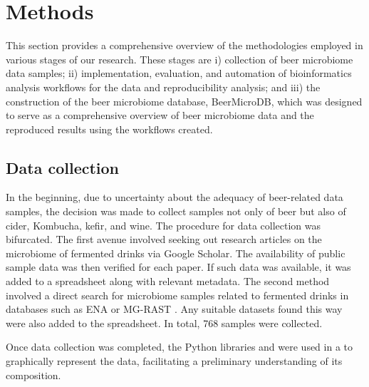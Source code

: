 \section{Methods}

    This section provides a comprehensive overview of the methodologies employed in various stages of our research. These stages are i) collection of beer microbiome data samples; ii) implementation, evaluation, and automation of bioinformatics analysis workflows for the data and reproducibility analysis; and iii) the construction of the beer microbiome database, BeerMicroDB, which was designed to serve as a comprehensive overview of beer microbiome data and the reproduced results using the workflows created. 
    
    \subsection{Data collection}

        In the beginning, due to uncertainty about the adequacy of beer-related data samples, the decision was made to collect samples not only of beer but also of cider, Kombucha, kefir, and wine. The procedure for data collection was bifurcated. The first avenue involved seeking out research articles on the microbiome of fermented drinks via Google Scholar. The availability of public sample data was then verified for each paper. If such data was available, it was added to a spreadsheet along with relevant metadata. The second method involved a direct search for microbiome samples related to fermented drinks in databases such as ENA or MG-RAST \cite{keegan2016mg}. Any suitable datasets found this way were also added to the spreadsheet. In total, 768 samples were collected.
        
        Once data collection was completed, the Python libraries  and  were used in a  to graphically represent the data, facilitating a preliminary understanding of its composition.

